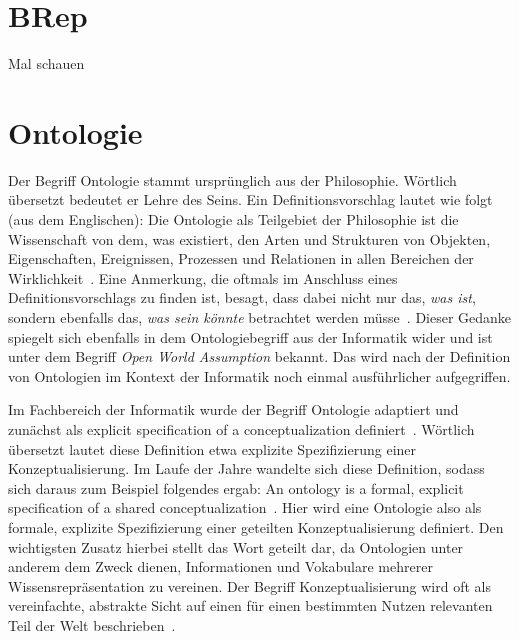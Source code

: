\section{BRep}
\label{basics:brep}
Mal schauen

\section{Ontologie}
Der Begriff Ontologie stammt ursprünglich aus der Philosophie.
Wörtlich übersetzt bedeutet er \glqq{}Lehre des Seins\grqq{}.
Ein Definitionsvorschlag lautet wie folgt (aus dem Englischen):
\glqq{}Die Ontologie als Teilgebiet der Philosophie ist die Wissenschaft von dem, was existiert, den Arten und Strukturen von Objekten, Eigenschaften, Ereignissen, Prozessen und Relationen in allen Bereichen der Wirklichkeit\grqq{}~\cite{Ontology}.
Eine Anmerkung, die oftmals im Anschluss eines Definitionsvorschlags zu finden ist, besagt, dass dabei nicht nur das, \textit{was ist}, sondern ebenfalls das, \textit{was sein könnte} betrachtet werden müsse~\cite{Ontology}\cite{OntologieDefinitionLMU:online}.
Dieser Gedanke spiegelt sich ebenfalls in dem Ontologiebegriff aus der Informatik wider und ist unter dem Begriff \textit{Open World Assumption} bekannt.
Das wird nach der Definition von Ontologien im Kontext der Informatik noch einmal ausführlicher aufgegriffen.

Im Fachbereich der Informatik wurde der Begriff Ontologie adaptiert und zunächst als \glqq{}explicit specification of a conceptualization\grqq{} definiert~\cite{Gruber1993}.
Wörtlich übersetzt lautet diese Definition etwa \glqq{}explizite Spezifizierung einer Konzeptualisierung\grqq{}.
Im Laufe der Jahre wandelte sich diese Definition, sodass sich daraus zum Beispiel folgendes ergab: \glqq{}An ontology is a formal, explicit specification of a shared conceptualization\grqq{}~\cite{Studer1998}.
Hier wird eine Ontologie also als \glqq{}formale, explizite Spezifizierung einer geteilten Konzeptualisierung\grqq{} definiert.
Den wichtigsten Zusatz hierbei stellt das Wort \glqq{}geteilt\grqq{} dar, da Ontologien unter anderem dem Zweck dienen, Informationen und Vokabulare mehrerer Wissensrepräsentation zu vereinen.
Der Begriff Konzeptualisierung wird oft als \glqq{}vereinfachte, abstrakte Sicht auf einen für einen bestimmten Nutzen relevanten Teil der Welt\grqq{} beschrieben~\cite{Guarino2009}.

